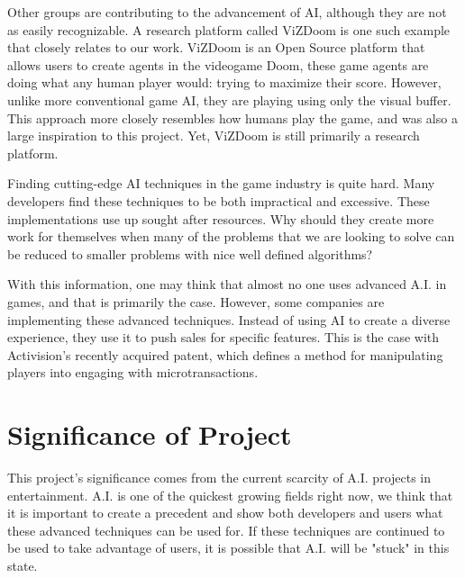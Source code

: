 Other groups are contributing to the advancement of AI, although they are not as easily recognizable. A research platform called ViZDoom is one such example that closely relates to our work. ViZDoom is an Open Source platform that allows users to create agents in the videogame Doom, these game agents are doing what any human player would: trying to maximize their score. However, unlike more conventional game AI, they are playing using only the visual buffer. This approach more closely resembles how humans play the game, and was also a large inspiration to this project. Yet, ViZDoom is still primarily a research platform.

Finding cutting-edge AI techniques in the game industry is quite hard. Many developers find these techniques to be both impractical and excessive. These implementations use up sought after resources. Why should they create more work for themselves when many of the problems that we are looking to solve can be reduced to smaller problems with nice well defined algorithms?

With this information, one may think that almost no one uses advanced A.I. in games, and that is primarily the case. However, some companies are implementing these advanced techniques. Instead of using AI to create a diverse experience, they use it to push sales for specific features. This is the case with Activision's recently acquired patent, which defines a method for manipulating players into engaging with microtransactions.



\section{Significance of Project}

This project's significance comes from the current scarcity of A.I. projects in entertainment. A.I. is one of the quickest growing fields right now, we think that it is important to create a precedent and show both developers and users what these advanced techniques can be used for. If these techniques are continued to be used to take advantage of users, it is possible that A.I. will be "stuck" in this state.

